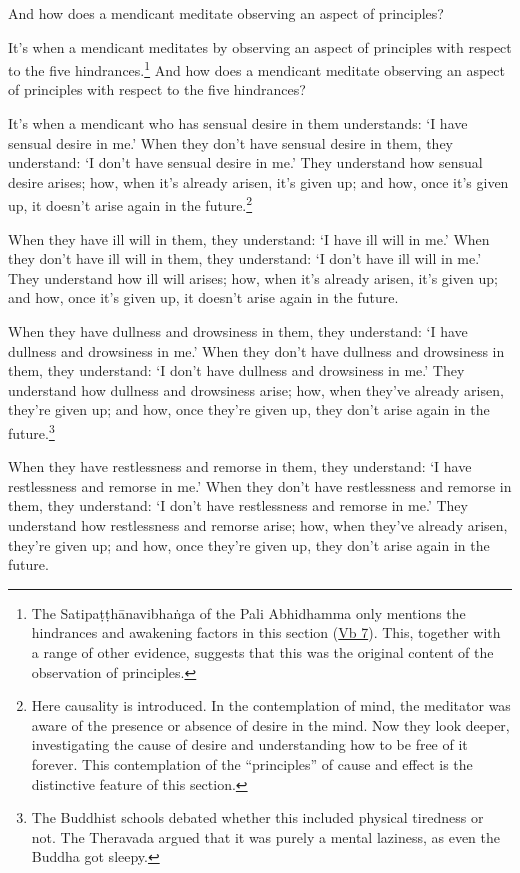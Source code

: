 \documentclass[12pt,openany]{book}%
\begin{document}
And how does a mendicant meditate observing an aspect of principles? 

It’s when a mendicant meditates by observing an aspect of principles with respect to the five hindrances.\footnote{The \textsanskrit{Satipaṭṭhānavibhaṅga} of the Pali Abhidhamma only mentions the hindrances and awakening factors in this section (\href{https://suttacentral.net/vb7}{Vb 7}). This, together with a range of other evidence, suggests that this was the original content of the observation of principles. } And how does a mendicant meditate observing an aspect of principles with respect to the five hindrances? 

It’s when a mendicant who has sensual desire in them understands: ‘I have sensual desire in me.’ When they don’t have sensual desire in them, they understand: ‘I don’t have sensual desire in me.’ They understand how sensual desire arises; how, when it’s already arisen, it’s given up; and how, once it’s given up, it doesn’t arise again in the future.\footnote{Here causality is introduced. In the contemplation of mind, the meditator was aware of the presence or absence of desire in the mind. Now they look deeper, investigating the cause of desire and understanding how to be free of it forever. This contemplation of the “principles” of cause and effect is the distinctive feature of this section. } 

When they have ill will in them, they understand: ‘I have ill will in me.’ When they don’t have ill will in them, they understand: ‘I don’t have ill will in me.’ They understand how ill will arises; how, when it’s already arisen, it’s given up; and how, once it’s given up, it doesn’t arise again in the future. 

When they have dullness and drowsiness in them, they understand: ‘I have dullness and drowsiness in me.’ When they don’t have dullness and drowsiness in them, they understand: ‘I don’t have dullness and drowsiness in me.’ They understand how dullness and drowsiness arise; how, when they’ve already arisen, they’re given up; and how, once they’re given up, they don’t arise again in the future.\footnote{The Buddhist schools debated whether this included physical tiredness or not. The Theravada argued that it was purely a mental laziness, as even the Buddha got sleepy. } 

When they have restlessness and remorse in them, they understand: ‘I have restlessness and remorse in me.’ When they don’t have restlessness and remorse in them, they understand: ‘I don’t have restlessness and remorse in me.’ They understand how restlessness and remorse arise; how, when they’ve already arisen, they’re given up; and how, once they’re given up, they don’t arise again in the future. 
\end{document}
